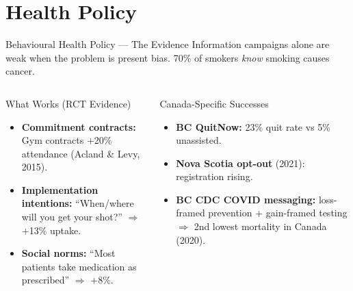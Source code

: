 \documentclass[aspectratio=169]{beamer}
\begin{document}
\section{Health Policy}

\begin{frame}{Behavioural Health Policy --- The Evidence}
Information campaigns alone are weak when the problem is present bias. 70\% of smokers \textit{know} smoking causes cancer.
\begin{columns}
\begin{exampleblock}{What Works (RCT Evidence)}
\begin{itemize}\small
  \item \textbf{Commitment contracts:} Gym contracts $+$20\% attendance (Acland \& Levy, 2015).
  \item \textbf{Implementation intentions:} ``When/where will you get your shot?'' $\Rightarrow$ $+$13\% uptake.
  \item \textbf{Social norms:} ``Most patients take medication as prescribed'' $\Rightarrow$ $+$8\%.
\end{itemize}
\end{exampleblock}
\begin{block}{Canada-Specific Successes}
\begin{itemize}\small
  \item \textbf{BC QuitNow:} 23\% quit rate vs 5\% unassisted.
  \item \textbf{Nova Scotia opt-out} (2021): registration rising.
  \item \textbf{BC CDC COVID messaging:} loss-framed prevention + gain-framed testing $\Rightarrow$ 2nd lowest mortality in Canada (2020).
\end{itemize}
\end{block}
\end{columns}
\end{frame}
\end{document}
